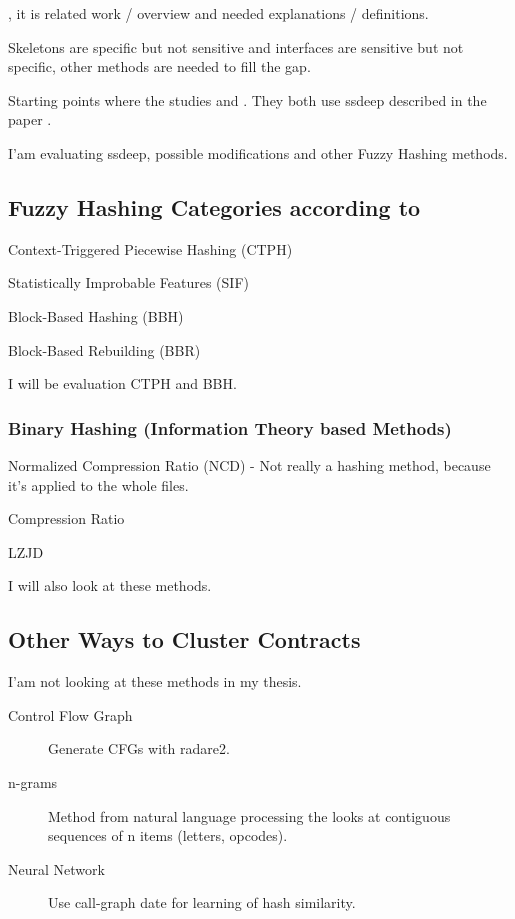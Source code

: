 \documentclass[../main.tex]{subfiles}
\begin{document}
, it is related work / overview and needed explanations / definitions.

Skeletons are specific but not sensitive and interfaces are sensitive but not specific, other methods are needed to fill the gap.

Starting points where the studies  and .
They both use ssdeep\cite{ssdeep} described in the paper .

I'am evaluating ssdeep, possible modifications and other Fuzzy Hashing methods.

\subsection{Fuzzy Hashing Categories according to }
\begin{ul}
  \item Context-Triggered Piecewise Hashing (CTPH)
  \item Statistically Improbable Features (SIF)
  \item Block-Based Hashing (BBH)
  \item Block-Based Rebuilding (BBR)
\end{ul}
I will be evaluation CTPH and BBH.

\subsubsection{Binary Hashing (Information Theory based Methods)}
\begin{ul}
  \item Normalized Compression Ratio (NCD) - Not really a hashing method, because it's applied to the whole files.
  \item Compression Ratio
  \item LZJD
\end{ul}
I will also look at these methods.

\subsection{Other Ways to Cluster Contracts}
I'am not looking at these methods in my thesis.
\begin{description}
  \item[Control Flow Graph] Generate CFGs with radare2.
  \item[n-grams] Method from natural language processing the looks at contiguous sequences of n items (letters, opcodes).
  \item[Neural Network] Use call-graph date for learning of hash similarity.
\end{description}
\end{document}
